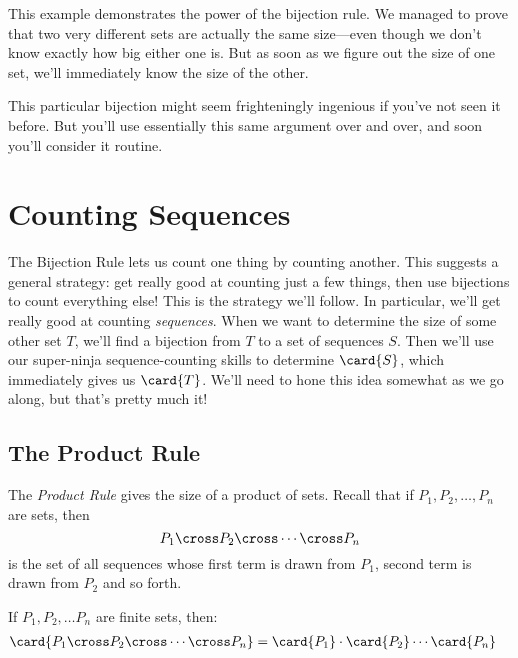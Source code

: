 This example demonstrates the power of the bijection rule.
We managed to prove that two very different sets are actually the same
size---even though we don't know exactly how big either one is.  But
as soon as we figure out the size of one set, we'll immediately know
the size of the other.

This particular bijection might seem frighteningly ingenious if you've
not seen it before.  But you'll use essentially this same argument
over and over, and soon you'll consider it routine.

\section{Counting Sequences}\label{sec:counting_sequences}

The Bijection Rule lets us count one thing by counting another.  This
suggests a general strategy: get really good at counting just a few
things, then use bijections to count everything else!  This is the
strategy we'll follow.  In particular, we'll get really good at
counting \emph{sequences}.  When we want to determine the size of some
other set $T$, we'll find a bijection from $T$ to a set of sequences
$S$.  Then we'll use our super-ninja sequence-counting skills to
determine $\card{S}$, which immediately gives us $\card{T}$.  We'll
need to hone this idea somewhat as we go along, but that's pretty much
it!

\subsection{The Product Rule}

The \emph{Product Rule}%
gives the size of a product of sets.  Recall
that if $P_1, P_2, \ldots, P_n$ are sets, then
%
\[
P_1 \cross P_2 \cross \cdots \cross P_n
\]
%
is the set of all sequences whose first term is drawn from $P_1$,
second term is drawn from $P_2$ and so forth.

\begin{rul}
If $P_1, P_2, \ldots P_n$ are finite sets, then:
%
\begin{align*}
\card{P_1 \cross P_2 \cross \cdots \cross P_n}
    & = \card{P_1} \cdot \card{P_2} \cdots \card{P_n}
\end{align*}
\end{rul}

